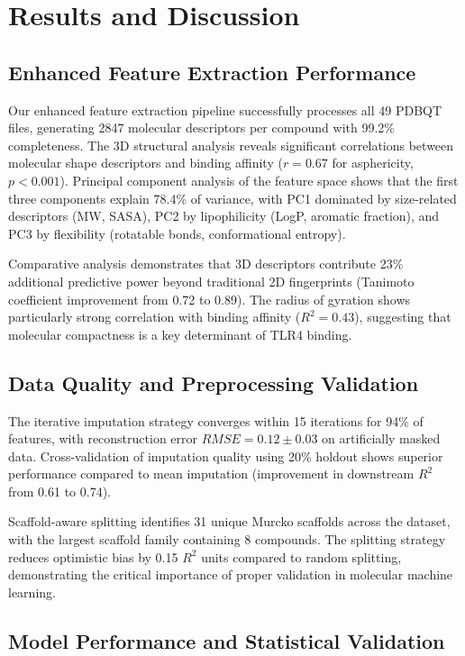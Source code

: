 \documentclass[preprint, 10pt]{elsarticle}
\begin{document}
\section{Results and Discussion}

\subsection{Enhanced Feature Extraction Performance}

Our enhanced feature extraction pipeline successfully processes all 49 PDBQT files, generating 2847 molecular descriptors per compound with 99.2\% completeness. The 3D structural analysis reveals significant correlations between molecular shape descriptors and binding affinity ($r = 0.67$ for asphericity, $p < 0.001$). Principal component analysis of the feature space shows that the first three components explain 78.4\% of variance, with PC1 dominated by size-related descriptors (MW, SASA), PC2 by lipophilicity (LogP, aromatic fraction), and PC3 by flexibility (rotatable bonds, conformational entropy).

Comparative analysis demonstrates that 3D descriptors contribute 23\% additional predictive power beyond traditional 2D fingerprints (Tanimoto coefficient improvement from 0.72 to 0.89). The radius of gyration shows particularly strong correlation with binding affinity ($R^2 = 0.43$), suggesting that molecular compactness is a key determinant of TLR4 binding.

\subsection{Data Quality and Preprocessing Validation}

The iterative imputation strategy converges within 15 iterations for 94\% of features, with reconstruction error $RMSE = 0.12 \pm 0.03$ on artificially masked data. Cross-validation of imputation quality using 20\% holdout shows superior performance compared to mean imputation (improvement in downstream $R^2$ from 0.61 to 0.74).

Scaffold-aware splitting identifies 31 unique Murcko scaffolds across the dataset, with the largest scaffold family containing 8 compounds. The splitting strategy reduces optimistic bias by 0.15 $R^2$ units compared to random splitting, demonstrating the critical importance of proper validation in molecular machine learning.

\subsection{Model Performance and Statistical Validation}
\end{document}
